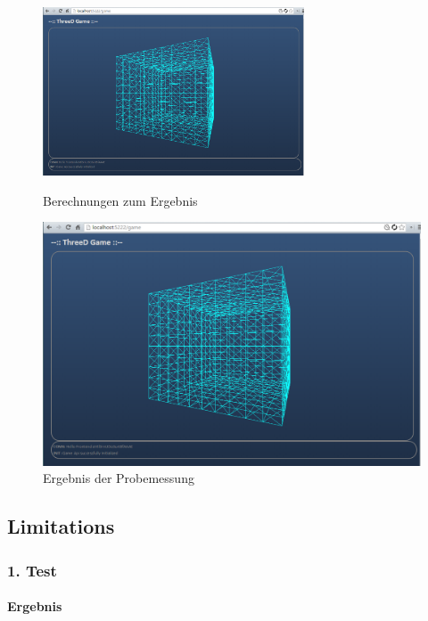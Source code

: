 \documentclass[a4paper]{spie}  %
\begin{document}
\begin{figure}[H]
\begin{minipage}[t]{0.4\textwidth}
\vspace{0pt}
\includegraphics[height=5cm]{./images/FrontendInit.png}
\caption{Berechnungen zum Ergebnis}
\label{fig:tablleMessung}
\end{minipage}
\hfill
\begin{minipage}[t]{0.5\textwidth}
\vspace{0pt}
		\includegraphics[width=\textwidth]{./images/FrontendInit.png}
		\caption{Ergebnis der Probemessung}
		\label{fig:test1}
\end{minipage}
\end{figure}

\subsection{Limitations}
\subsubsection{1. Test}

\paragraph{Ergebnis}\mbox{}\\
\end{document}
